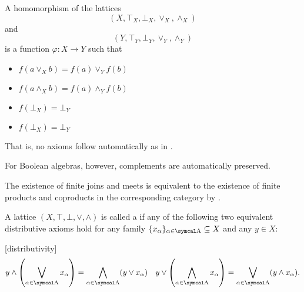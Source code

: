 \begin{proposition}\label{thm:lattice_homomorphism}
  A homomorphism of the lattices
  \begin{equation*}
    (X, \top_X, \bot_X, \vee_X, \wedge_X)
  \end{equation*}
  and
  \begin{equation*}
    (Y, \top_Y, \bot_Y, \vee_Y, \wedge_Y)
  \end{equation*}
  is a function \( \varphi: X \to Y \) such that
  \begin{itemize}
    \item \( f(a \vee_X b) = f(a) \vee_Y f(b) \)
    \item \( f(a \wedge_X b) = f(a) \wedge_Y f(b) \)
    \item \( f(\bot_X) = \bot_Y \)
    \item \( f(\bot_X) = \bot_Y \)
  \end{itemize}

  That is, no axioms follow automatically as in .

  For Boolean algebras, however, complements are automatically preserved.
\end{proposition}

\begin{remark}\label{def:lattice_categorical_product}
  The existence of finite joins and meets is equivalent to the existence of finite products and coproducts in the corresponding category by .
\end{remark}

\begin{definition}\label{def:distributive_lattice}\cite{nLab:distributive_lattice}
  A lattice \( (X, \top, \bot, \vee, \wedge) \) is called a  if any of the following two equivalent distributive axioms hold for any family \( \{ x_\al \}_{\al \in \CA} \subseteq X \) and any \( y \in X \):
  \begin{description}
    [distributivity]
    \begin{align*}
      y \wedge \left( \bigvee_{\al \in \CA} x_\al \right) = \bigwedge_{\al \in \CA} (y \vee x_\al)
      &&
      y \vee \left( \bigwedge_{\al \in \CA} x_\al \right) = \bigvee_{\al \in \CA} (y \wedge x_\al).
    \end{align*}
  \end{description}
\end{definition}

